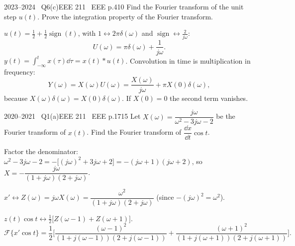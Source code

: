 \begin{qcard}{2023--2024 \textbullet\ Q6(c)}{EEE 211 \textbullet\ EEE p.4}{10}
Find the Fourier transform of the unit step $u(t)$. Prove the integration property of the Fourier transform.
\end{qcard}
\begin{solution}
 $u(t)=\frac12+\frac12\operatorname{sign}(t)$, with $1\leftrightarrow2\pi\delta(\omega)$ and $\operatorname{sign}\leftrightarrow\frac2{j\omega}$:
\[U(\omega)=\pi\delta(\omega)+\frac1{j\omega}.\]
 $y(t)=\int_{-\infty}^tx(\tau)\dd\tau=x(t)*u(t)$. Convolution in time is multiplication in frequency:
\[Y(\omega)=X(\omega)U(\omega)=\frac{X(\omega)}{j\omega}+\pi X(0)\delta(\omega),\]
because $X(\omega)\delta(\omega)=X(0)\delta(\omega)$. If $X(0)=0$ the second term vanishes.
\end{solution}

\begin{qcard}{2020--2021 \textbullet\ Q1(a)}{EEE 211 \textbullet\ EEE p.17}{15}
Let $X(\omega)=\dfrac{j\omega}{\omega^2-3j\omega-2}$ be the Fourier transform of $x(t)$. Find the Fourier transform of $\dfrac{\dd x}{\dd t}\cos t$.
\end{qcard}
\begin{solution}
Factor the denominator: $\omega^2-3j\omega-2=-\big[(j\omega)^2+3j\omega+2\big]=-(j\omega+1)(j\omega+2)$, so $X=-\dfrac{j\omega}{(1+j\omega)(2+j\omega)}$.

 $x'\leftrightarrow Z(\omega)=j\omega X(\omega)=\dfrac{\omega^2}{(1+j\omega)(2+j\omega)}$ (since $-(j\omega)^2=\omega^2$).

 $z(t)\cos t\leftrightarrow\frac12\big[Z(\omega-1)+Z(\omega+1)\big]$.
\[
\mathcal F\{x'\cos t\}=\frac12\Big[\frac{(\omega-1)^2}{(1+j(\omega-1))(2+j(\omega-1))}+\frac{(\omega+1)^2}{(1+j(\omega+1))(2+j(\omega+1))}\Big].
\]
\end{solution}

